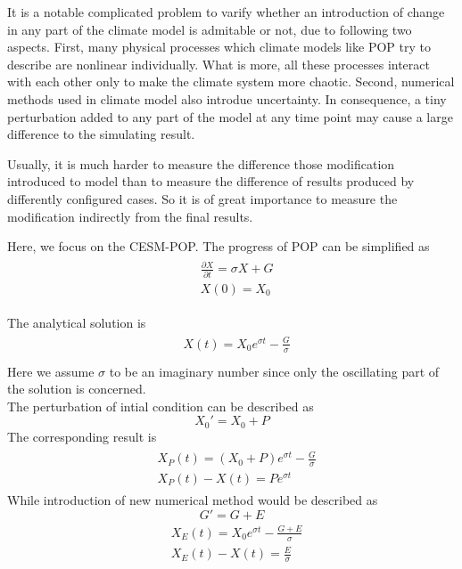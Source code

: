 \documentclass{sig-alternate}
\begin{document}
It is a notable complicated problem to varify whether an introduction of change in any part of the climate model is admitable or not, due to following two aspects. First, many physical processes which climate models like POP try to describe are nonlinear individually. What is more, all these processes interact with each other only to make the climate system more chaotic. Second, numerical methods used in climate model also introdue uncertainty. In consequence, a tiny perturbation added to any part of the model at any time point may cause a large difference to the simulating result.   

Usually, it is much harder to measure the difference those modification introduced to model than to measure the difference of results produced by differently configured cases. So it is of great importance to measure the modification indirectly from the final results. 

Here, we focus on the CESM-POP. 
The progress of POP can be simplified as 
\begin{eqnarray*}
\begin{aligned}
&\frac{\partial X}{\partial t} = \sigma X +G \\
&X(0) = X_0 
\end{aligned}
\end{eqnarray*}

The analytical solution is 
\begin{eqnarray*}
\begin{aligned}
&X(t) = X_0e^{\sigma t } -\frac{G}{\sigma} \\
\end{aligned}
\end{eqnarray*}
Here we assume $\sigma$ to be an imaginary number since only the oscillating part of the solution is concerned. \\
The perturbation of intial condition can be described as $$X_0' =X_0+P$$
The corresponding result is 
\begin{eqnarray*}
\begin{aligned}
&X_P(t) = (X_0+P)e^{\sigma t } -\frac{G}{\sigma} \\
&X_P(t)-X(t) = Pe^{\sigma t }
\end{aligned}
\end{eqnarray*}
While introduction of new numerical method would be described as $$G' = G + E$$
\begin{eqnarray*}
\begin{aligned}
&X_E(t) = X_0e^{\sigma t } -\frac{G+E}{\sigma} \\
&X_E(t)-X(t) = \frac{E}{\sigma}
\end{aligned}
\end{eqnarray*}
\end{document}
